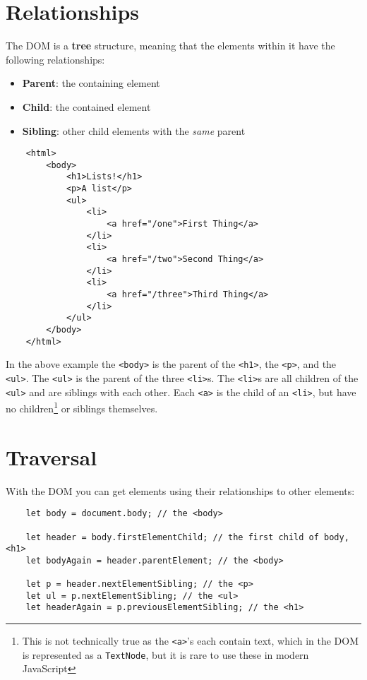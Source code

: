 \section{Relationships}

The DOM is a \textbf{tree} structure, meaning that the elements within it have the following relationships:

\begin{itemize}
    \item \textbf{Parent}: the containing element
    \item \textbf{Child}: the contained element
    \item \textbf{Sibling}: other child elements with the \textit{same} parent
\end{itemize}

\begin{verbatim}
    <html>
        <body>
            <h1>Lists!</h1>
            <p>A list</p>
            <ul>
                <li>
                    <a href="/one">First Thing</a>
                </li>
                <li>
                    <a href="/two">Second Thing</a>
                </li>
                <li>
                    <a href="/three">Third Thing</a>
                </li>
            </ul>
        </body>
    </html>
\end{verbatim}

In the above example the \texttt{<body>} is the parent of the \texttt{<h1>}, the \texttt{<p>}, and the \texttt{<ul>}. The \texttt{<ul>} is the parent of the three \texttt{<li>}s. The \texttt{<li>}s are all children of the \texttt{<ul>} and are siblings with each other. Each \texttt{<a>} is the child of an \texttt{<li>}, but have no children\footnote{This is not technically true as the \texttt{<a>}'s each contain text, which in the DOM is represented as a \texttt{TextNode}, but it is rare to use these in modern JavaScript} or siblings themselves.



\section{Traversal}

With the DOM you can get elements using their relationships to other elements:

\begin{verbatim}
    let body = document.body; // the <body>

    let header = body.firstElementChild; // the first child of body, <h1>
    let bodyAgain = header.parentElement; // the <body>

    let p = header.nextElementSibling; // the <p>
    let ul = p.nextElementSibling; // the <ul>
    let headerAgain = p.previousElementSibling; // the <h1>
\end{verbatim}

